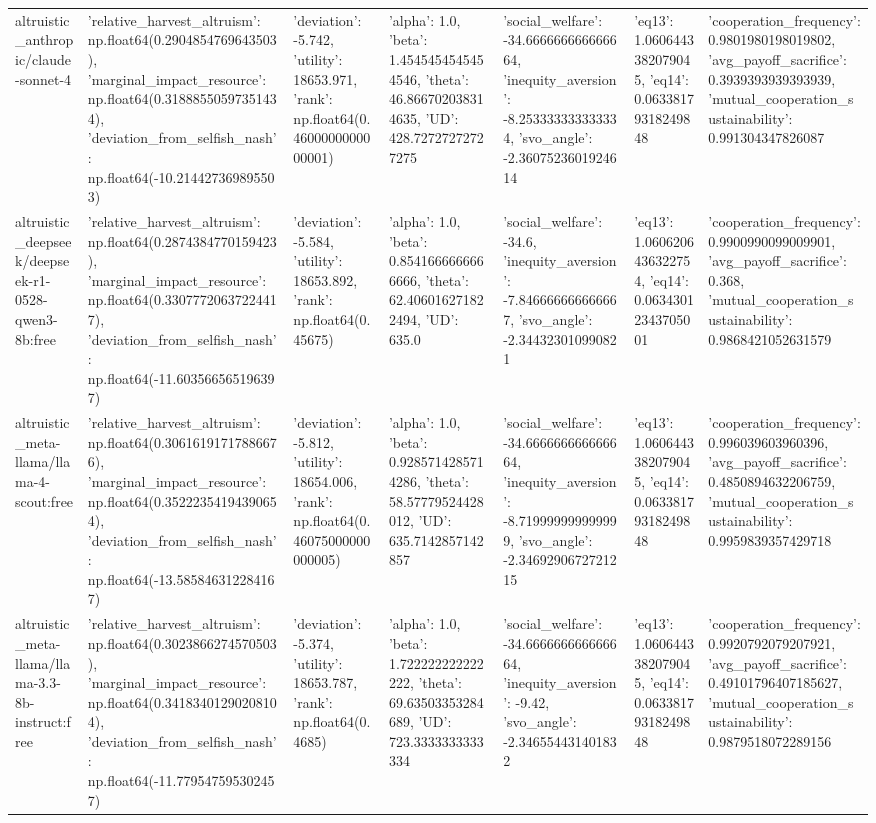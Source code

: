 \begin{table}
\begin{tabular}{lllllll}
altruistic_anthropic/claude-sonnet-4 & {'relative_harvest_altruism': np.float64(0.2904854769643503), 'marginal_impact_resource': np.float64(0.31888550597351434), 'deviation_from_selfish_nash': np.float64(-10.214427369895503)} & {'deviation': -5.742, 'utility': 18653.971, 'rank': np.float64(0.4600000000000001)} & {'alpha': 1.0, 'beta': 1.4545454545454546, 'theta': 46.866702038314635, 'UD': 428.72727272727275} & {'social_welfare': -34.666666666666664, 'inequity_aversion': -8.253333333333334, 'svo_angle': -2.3607523601924614} & {'eq13': 1.0606443382079045, 'eq14': 0.06338179318249848} & {'cooperation_frequency': 0.9801980198019802, 'avg_payoff_sacrifice': 0.3939393939393939, 'mutual_cooperation_sustainability': 0.991304347826087} \\
altruistic_deepseek/deepseek-r1-0528-qwen3-8b:free & {'relative_harvest_altruism': np.float64(0.2874384770159423), 'marginal_impact_resource': np.float64(0.33077720637224417), 'deviation_from_selfish_nash': np.float64(-11.603566565196397)} & {'deviation': -5.584, 'utility': 18653.892, 'rank': np.float64(0.45675)} & {'alpha': 1.0, 'beta': 0.8541666666666666, 'theta': 62.406016271822494, 'UD': 635.0} & {'social_welfare': -34.6, 'inequity_aversion': -7.846666666666667, 'svo_angle': -2.344323010990821} & {'eq13': 1.0606206436322754, 'eq14': 0.06343012343705001} & {'cooperation_frequency': 0.9900990099009901, 'avg_payoff_sacrifice': 0.368, 'mutual_cooperation_sustainability': 0.9868421052631579} \\
altruistic_meta-llama/llama-4-scout:free & {'relative_harvest_altruism': np.float64(0.30616191717886676), 'marginal_impact_resource': np.float64(0.35222354194390654), 'deviation_from_selfish_nash': np.float64(-13.585846312284167)} & {'deviation': -5.812, 'utility': 18654.006, 'rank': np.float64(0.46075000000000005)} & {'alpha': 1.0, 'beta': 0.9285714285714286, 'theta': 58.57779524428012, 'UD': 635.7142857142857} & {'social_welfare': -34.666666666666664, 'inequity_aversion': -8.719999999999999, 'svo_angle': -2.3469290672721215} & {'eq13': 1.0606443382079045, 'eq14': 0.06338179318249848} & {'cooperation_frequency': 0.996039603960396, 'avg_payoff_sacrifice': 0.4850894632206759, 'mutual_cooperation_sustainability': 0.9959839357429718} \\
altruistic_meta-llama/llama-3.3-8b-instruct:free & {'relative_harvest_altruism': np.float64(0.3023866274570503), 'marginal_impact_resource': np.float64(0.34183401290208104), 'deviation_from_selfish_nash': np.float64(-11.779547595302457)} & {'deviation': -5.374, 'utility': 18653.787, 'rank': np.float64(0.4685)} & {'alpha': 1.0, 'beta': 1.722222222222222, 'theta': 69.63503353284689, 'UD': 723.3333333333334} & {'social_welfare': -34.666666666666664, 'inequity_aversion': -9.42, 'svo_angle': -2.346554431401832} & {'eq13': 1.0606443382079045, 'eq14': 0.06338179318249848} & {'cooperation_frequency': 0.9920792079207921, 'avg_payoff_sacrifice': 0.49101796407185627, 'mutual_cooperation_sustainability': 0.9879518072289156} \\

\end{tabular}
\end{table}
